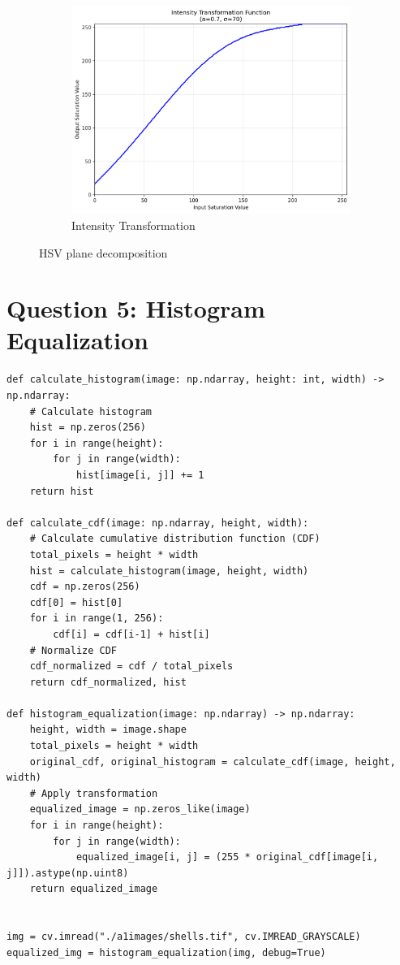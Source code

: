 \documentclass[11pt]{article}
\begin{document}
\begin{figure}[H]
\begin{subfigure}{0.3\textwidth}
        \includegraphics[width=\textwidth]{resources/spider_transformation_graph.png}
        \caption{Intensity Transformation}
    \end{subfigure}
    \caption{HSV plane decomposition}
\end{figure}
\newpage
\section*{Question 5: Histogram Equalization}

\begin{lstlisting}[style=pythonstyle]
def calculate_histogram(image: np.ndarray, height: int, width) -> np.ndarray:
    # Calculate histogram
    hist = np.zeros(256)
    for i in range(height):
        for j in range(width):
            hist[image[i, j]] += 1
    return hist

def calculate_cdf(image: np.ndarray, height, width):
    # Calculate cumulative distribution function (CDF)
    total_pixels = height * width
    hist = calculate_histogram(image, height, width)
    cdf = np.zeros(256)
    cdf[0] = hist[0]
    for i in range(1, 256):
        cdf[i] = cdf[i-1] + hist[i]
    # Normalize CDF
    cdf_normalized = cdf / total_pixels
    return cdf_normalized, hist

def histogram_equalization(image: np.ndarray) -> np.ndarray:
    height, width = image.shape
    total_pixels = height * width
    original_cdf, original_histogram = calculate_cdf(image, height, width)
    # Apply transformation
    equalized_image = np.zeros_like(image)
    for i in range(height):
        for j in range(width):
            equalized_image[i, j] = (255 * original_cdf[image[i, j]]).astype(np.uint8)
    return equalized_image


img = cv.imread("./a1images/shells.tif", cv.IMREAD_GRAYSCALE)
equalized_img = histogram_equalization(img, debug=True)
\end{lstlisting}
\end{document}
